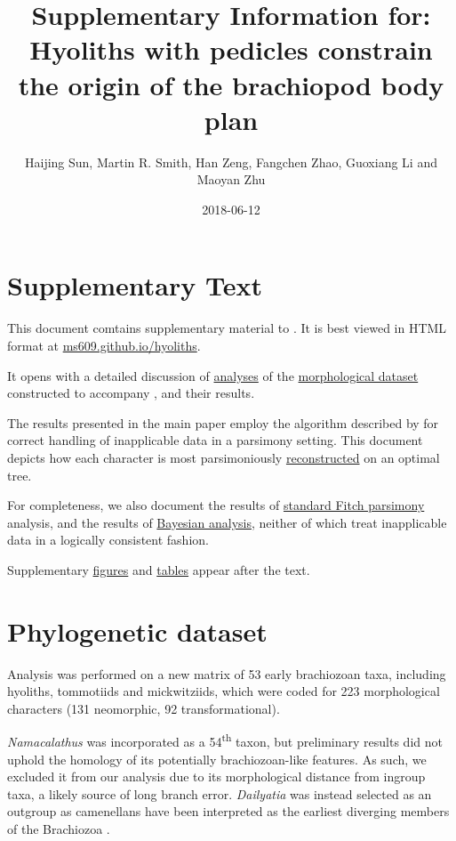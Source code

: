 \documentclass[openany]{book}
\title{Supplementary Information for: \newline\newline Hyoliths with pedicles
constrain the origin of the brachiopod body plan}
\author{Haijing Sun, Martin R. Smith, Han Zeng, Fangchen Zhao, Guoxiang Li and
Maoyan Zhu}
\date{2018-06-12}
\theoremstyle{definition}
\theoremstyle{definition}
\theoremstyle{definition}
\theoremstyle{remark}
\begin{document}
\maketitle

{
\setcounter{tocdepth}{1}
\tableofcontents
}
\chapter*{Supplementary Text}\label{supplementary-text}

This document comtains supplementary material to
\citet{Sun2018Hyolithswith}. It is best viewed in HTML format at
\href{https://ms609.github.io/hyoliths/}{ms609.github.io/hyoliths}.

It opens with a detailed discussion of
\protect\hyperlink{treesearch}{analyses} of the
\protect\hyperlink{dataset}{morphological dataset} constructed to
accompany \citet{Sun2018Hyolithswith}, and their results.

The results presented in the main paper employ the algorithm described
by \citet{Brazeau2018} for correct handling of inapplicable data in a
parsimony setting. This document depicts how each character is most
parsimoniously \protect\hyperlink{reconstructions}{reconstructed} on an
optimal tree.

For completeness, we also document the results of
\protect\hyperlink{fitch}{standard Fitch parsimony} analysis, and the
results of \protect\hyperlink{bayesian}{Bayesian analysis}, neither of
which treat inapplicable data in a logically consistent fashion.

Supplementary \protect\hyperlink{figures}{figures} and
\protect\hyperlink{table}{tables} appear after the text.

\hypertarget{dataset}{\chapter{Phylogenetic dataset}\label{dataset}}

Analysis was performed on a new matrix of 53 early brachiozoan taxa,
including hyoliths, tommotiids and mickwitziids, which were coded for
223 morphological characters (131 neomorphic, 92 transformational).

\emph{Namacalathus} was incorporated as a 54\textsuperscript{th} taxon,
but preliminary results did not uphold the homology of its potentially
brachiozoan-like features. As such, we excluded it from our analysis due
to its morphological distance from ingroup taxa, a likely source of long
branch error. \emph{Dailyatia} was instead selected as an outgroup as
camenellans have been interpreted as the earliest diverging members of
the Brachiozoa \citep{Skovsted2015Theearly, Zhao2017}.
\end{document}
